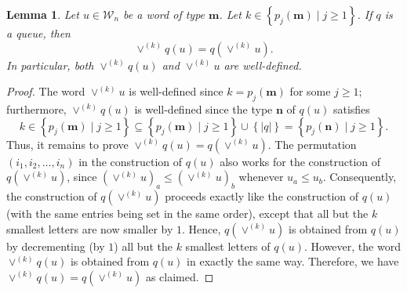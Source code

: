 \documentclass[reqno]{amsart}%
\newcommand{\0}{\phantom{c}}
\newcommand{\mm}{\mathbf{m}}
\theoremstyle{plain}
\newtheorem{lemma}[thm]{Lemma}
\theoremstyle{definition}
\numberwithin{equation}{section}
\newcommand{\Travis}[1]{\todo[size=\tiny,inline,color=blue!30]{#1
      \\ \hfill --- Travis}}
\begin{document}


\begin{lemma}
\label{lemma:queue_merge_commute} Let $u \in\mathcal{W}_{n}$ be a word of type
$\mathbf{m}$. Let $k \in\left\{  p_{j}(\mathbf{m}) \mid j \geq1 \right\}  $.
If $q$ is a queue, then
\[
\vee^{(k)} q(u) = q(\vee^{(k)} u).
\]
In particular, both $\vee^{(k)} q(u)$ and $\vee^{(k)} u$ are well-defined.
\end{lemma}

\begin{proof}
The word $\vee^{(k)} u$ is well-defined since $k = p_{j}(\mathbf{m})$ for some
$j \geq1$; furthermore, $\vee^{(k)} q(u)$ is well-defined since the type
$\mathbf{n}$ of $q(u)$ satisfies
\[
k \in\left\{  p_{j}(\mathbf{m}) \mid j \geq1 \right\}  \subseteq\left\{
p_{j}(\mathbf{m}) \mid j \geq1 \right\}  \cup\left\{  \left|  q \right|
\right\}  = \left\{  p_{j}(\mathbf{n}) \mid j \geq1 \right\}  .
\]
Thus, it remains to prove $\vee^{(k)} q(u) = q(\vee^{(k)} u)$. The permutation
$\left(  i_{1}, i_{2}, \dotsc, i_{n} \right)  $ in the construction of $q(u)$
also works for the construction of $q(\vee^{(k)} u)$, since $(\vee^{(k)}
u)_{a} \leq(\vee^{(k)} u)_{b}$ whenever $u_{a} \leq u_{b}$. Consequently, the
construction of $q(\vee^{(k)} u)$ proceeds exactly like the construction of
$q(u)$ (with the same entries being set in the same order), except that all
but the $k$ smallest letters are now smaller by $1$. Hence, $q(\vee^{(k)} u)$
is obtained from $q(u)$ by decrementing (by $1$) all but the $k$ smallest
letters of $q(u)$.
However, the word $\vee^{(k)} q(u)$ is obtained from $q(u)$ in exactly the
same way. Therefore, we have $\vee^{(k)} q(u) = q(\vee^{(k)} u)$ as claimed.
\end{proof}
\end{document}
